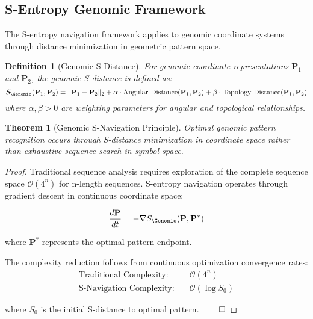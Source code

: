\documentclass[12pt,a4paper]{article}
\newtheorem{theorem}{Theorem}
\newtheorem{definition}{Definition}
\begin{document}
\subsection{S-Entropy Genomic Framework}

The S-entropy navigation framework applies to genomic coordinate systems through distance minimization in geometric pattern space.

\begin{definition}[Genomic S-Distance]
For genomic coordinate representations $\mathbf{P}_1$ and $\mathbf{P}_2$, the genomic S-distance is defined as:
\begin{equation}
S_{\Genomic}(\mathbf{P}_1, \mathbf{P}_2) = \|\mathbf{P}_1 - \mathbf{P}_2\|_2 + \alpha \cdot \text{Angular Distance}(\mathbf{P}_1, \mathbf{P}_2) + \beta \cdot \text{Topology Distance}(\mathbf{P}_1, \mathbf{P}_2)
\end{equation}
where $\alpha, \beta > 0$ are weighting parameters for angular and topological relationships.
\end{definition}

\begin{theorem}[Genomic S-Navigation Principle]
Optimal genomic pattern recognition occurs through S-distance minimization in coordinate space rather than exhaustive sequence search in symbol space.
\end{theorem}

\begin{proof}
Traditional sequence analysis requires exploration of the complete sequence space $\mathcal{O}(4^n)$ for n-length sequences. S-entropy navigation operates through gradient descent in continuous coordinate space:

\begin{equation}
\frac{d\mathbf{P}}{dt} = -\nabla S_{\Genomic}(\mathbf{P}, \mathbf{P}^*)
\end{equation}

where $\mathbf{P}^*$ represents the optimal pattern endpoint.

The complexity reduction follows from continuous optimization convergence rates:
\begin{align}
\text{Traditional Complexity:} \quad &\mathcal{O}(4^n) \\
\text{S-Navigation Complexity:} \quad &\mathcal{O}(\log S_0)
\end{align}

where $S_0$ is the initial S-distance to optimal pattern. $\qed$
\end{proof}
\end{document}
